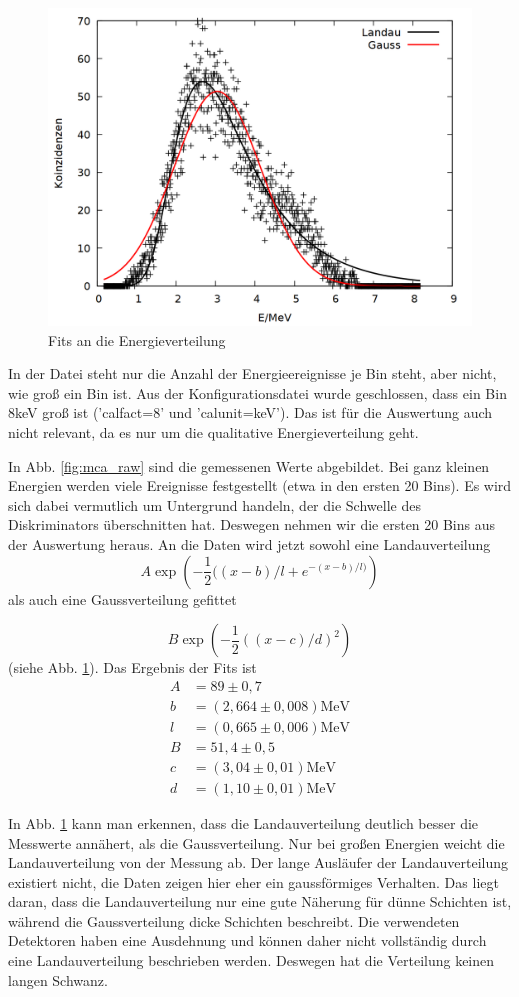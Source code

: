 \begin{figure}
\centering
\includegraphics[width=0.75\linewidth]{data/friedrich/mca.png}
\caption{Fits an die Energieverteilung}
\label{fig:mca}
\end{figure}

In der Datei steht nur die Anzahl der Energieereignisse je Bin steht, aber nicht, wie groß ein Bin ist. Aus der Konfigurationsdatei wurde geschlossen, dass ein Bin 8keV groß ist ('calfact=8' und 'calunit=keV'). Das ist für die Auswertung auch nicht relevant, da es nur um die qualitative Energieverteilung geht.  

In Abb. \ref{fig:mca_raw} sind die gemessenen Werte abgebildet. Bei ganz kleinen Energien werden viele Ereignisse festgestellt (etwa in den ersten 20 Bins). Es wird sich dabei vermutlich um Untergrund handeln, der die Schwelle des Diskriminators überschnitten hat. Deswegen nehmen wir die ersten 20 Bins aus der Auswertung heraus. An die Daten wird jetzt sowohl eine Landauverteilung
\[A\exp{\left(-\frac{1}{2}((x-b)/l + e^{-(x-b)/l)}\right)}\] als auch eine Gaussverteilung gefittet

\[B\exp{\left(-\frac{1}{2}((x-c)/d)^2 \right)}\]
 (siehe Abb. \ref{fig:mca}). Das Ergebnis der Fits ist
 \begin{align}
 A &= 89 \pm 0,7\\
 b &= (2,664 \pm 0,008)\si{\mega\eV}\\
 l &= (0,665  \pm 0,006)\si{\mega\eV}\\
 B &= 51,4 \pm 0,5\\
 c &= (3,04\pm 0,01)\si{\mega\eV}\\
 d &=( 1,10 \pm 0,01) \si{\mega\eV}
 \end{align}
 
In Abb. \ref{fig:mca} kann man erkennen, dass die Landauverteilung deutlich besser die Messwerte annähert, als die Gaussverteilung. Nur bei großen Energien weicht die Landauverteilung von der Messung ab. Der lange Ausläufer der Landauverteilung existiert nicht, die Daten zeigen hier eher ein gaussförmiges Verhalten. Das liegt daran, dass die Landauverteilung nur eine gute Näherung für dünne Schichten ist, während die Gaussverteilung dicke Schichten beschreibt. Die verwendeten Detektoren haben eine Ausdehnung und können daher nicht vollständig durch eine Landauverteilung beschrieben werden. Deswegen hat die Verteilung keinen langen Schwanz.\\

